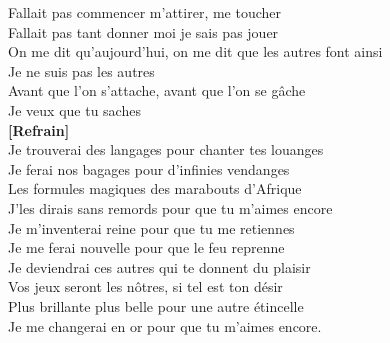 \documentclass{novel}
\begin{document}
Fallait pas commencer m'attirer, me toucher\\
Fallait pas tant donner moi je sais pas jouer\\
On me dit qu'aujourd'hui, on me dit que les autres font ainsi\\
Je ne suis pas les autres\\
Avant que l'on s'attache, avant que l'on se gâche\\

Je veux que tu saches\\

\textbf{[Refrain]}\\

Je trouverai des langages pour chanter tes louanges\\
Je ferai nos bagages pour d'infinies vendanges\\
Les formules magiques des marabouts d'Afrique\\
J'les dirais sans remords pour que tu m'aimes encore\\

Je m'inventerai reine pour que tu me retiennes\\
Je me ferai nouvelle pour que le feu reprenne\\
Je deviendrai ces autres qui te donnent du plaisir\\
Vos jeux seront les nôtres, si tel est ton désir\\

Plus brillante plus belle pour une autre étincelle\\
Je me changerai en or pour que tu m'aimes encore.

\newpage
\large
\end{document}
